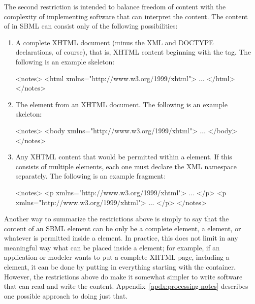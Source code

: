 The second restriction is intended to balance freedom of content
with the complexity of implementing software that can interpret
the content.  The content of  in SBML can consist
only of the following possibilities:
\begin{enumerate}
  
\item A complete XHTML document (minus the XML and DOCTYPE
  declarations, of course), that is, XHTML content beginning with
  the  tag.  The following is an example skeleton:
  \begin{example}
<notes>
    <html xmlns="http://www.w3.org/1999/xhtml">
      ...
    </html>
</notes>\end{example}

\item The  element from an XHTML document.  The
  following is an example skeleton:
  \begin{example}
<notes>
    <body xmlns="http://www.w3.org/1999/xhtml">
      ...
    </body>
</notes>\end{example}
  
\item Any XHTML content that would be permitted within a
   element.  If this consists of multiple
  elements, each one must declare the XML namespace separately.
  The following is an example fragment:
  \begin{example}
<notes>
    <p xmlns="http://www.w3.org/1999/xhtml">
      ...
    </p>
    <p xmlns="http://www.w3.org/1999/xhtml">
      ...
    </p>
</notes>\end{example}

\end{enumerate}

Another way to summarize the restrictions above is simply to say
that the content of an SBML  element can be only be a
complete  element, a  element, or whatever
is permitted inside a  element.  In practice, this
does not limit in any meaningful way what can be placed inside a
 element; for example, if an application or modeler
wants to put a complete XHTML page, including a 
element, it can be done by putting in everything starting with the
 container.  However, the restrictions above do make
it somewhat simpler to write software that can read and write the
 content.  Appendix~\ref{apdx:processing-notes}
describes one possible approach to doing just that.



